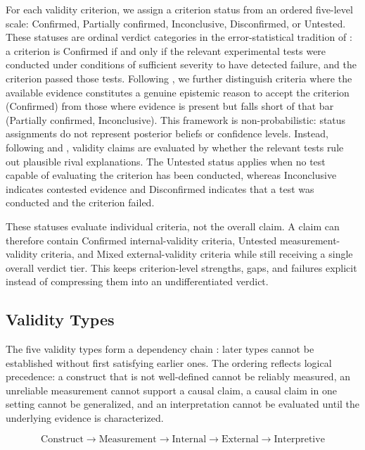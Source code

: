 \documentclass[10pt]{article}
\begin{document}
For each validity criterion, we assign a criterion status from an ordered five-level scale: Confirmed, Partially confirmed, Inconclusive, Disconfirmed, or Untested. These statuses are ordinal verdict categories in the error-statistical tradition of \citet{mayo1996error, mayo2018statistical}: a criterion is Confirmed if and only if the relevant experimental tests were conducted under conditions of sufficient severity to have detected failure, and the criterion passed those tests. Following \citet{achinstein2001book}, we further distinguish criteria where the available evidence constitutes a genuine epistemic reason to accept the criterion (Confirmed) from those where evidence is present but falls short of that bar (Partially confirmed, Inconclusive). This framework is non-probabilistic: status assignments do not represent posterior beliefs or confidence levels. Instead, following \citet{campbell1963experimental} and \citet{cook1979quasi}, validity claims are evaluated by whether the relevant tests rule out plausible rival explanations. The Untested status applies when no test capable of evaluating the criterion has been conducted, whereas Inconclusive indicates contested evidence and Disconfirmed indicates that a test was conducted and the criterion failed.


These statuses evaluate individual criteria, not the overall claim. A claim can therefore contain Confirmed internal-validity criteria, Untested measurement-validity criteria, and Mixed external-validity criteria while still receiving a single overall verdict tier. This keeps criterion-level strengths, gaps, and failures explicit instead of compressing them into an undifferentiated verdict.

\subsection{Validity Types}
\label{sec:validity-types}

The five validity types form a dependency chain \citep{shadish2002experimental}: later types cannot be established without first satisfying earlier ones. The ordering reflects logical precedence: a construct that is not well-defined cannot be reliably measured, an unreliable measurement cannot support a causal claim, a causal claim in one setting cannot be generalized, and an interpretation cannot be evaluated until the underlying evidence is characterized.

\begin{equation}
\text{Construct} \rightarrow \text{Measurement} \rightarrow \text{Internal} \rightarrow \text{External} \rightarrow \text{Interpretive}
\label{eq:dependency}
\end{equation}
\end{document}
